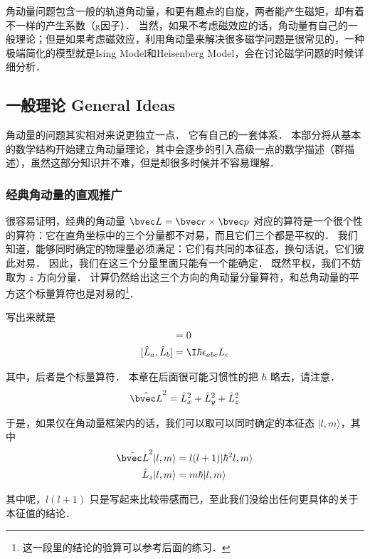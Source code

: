 
角动量问题包含一般的轨道角动量，和更有趣点的自旋，两者能产生磁矩，却有着不一样的产生系数（g因子）． 当然，如果不考虑磁效应的话，角动量有自己的一般理论；但是如果考虑磁效应，利用角动量来解决很多磁学问题是很常见的，一种极端简化的模型就是Ising Model和Heisenberg Model，会在讨论磁学问题的时候详细分析．

\subsection{一般理论 General Ideas}

角动量的问题其实相对来说更独立一点． 它有自己的一套体系． 本部分将从基本的数学结构开始建立角动量理论，其中会逐步的引入高级一点的数学描述（群描述），虽然这部分知识并不难，但是却很多时候并不容易理解．

\subsubsection{经典角动量的直观推广}

很容易证明，经典的角动量 $\bvec L = \bvec r\times \bvec p$ 对应的算符是一个很个性的算符：它在直角坐标中的三个分量都不对易，而且它们三个都是平权的． 我们知道，能够同时确定的物理量必须满足：它们有共同的本征态，换句话说，它们彼此对易． 因此，我们在这三个分量里面只能有一个能确定． 既然平权，我们不妨取为 $z$ 方向分量． 计算仍然给出这三个方向的角动量分量算符，和总角动量的平方这个标量算符也是对易的\footnote{这一段里的结论的验算可以参考后面的练习．}．

写出来就是
\begin{align}
[\hat L_z, \hat{\bvec L}^2] &= 0 \label{QMAM_eq1}\\
[\hat L_a, \hat L_b] &= \I\hbar\epsilon_{abc}L_c \label{QMAM_eq2}
\end{align}

其中，后者是个标量算符． 本章在后面很可能习惯性的把 $\hbar$ 略去，请注意．
\begin{equation}
\hat{\bvec L}^2 = \hat L_x^2+\hat L_y^2+\hat L_z^2
\end{equation}

于是，如果仅在角动量框架内的话，我们可以取可以同时确定的本征态 $|l,m\rangle$，其中
\begin{align}
\hat{\bvec L}^2|l,m\rangle &= l(l+1)|\hbar^2l,m\rangle\\
\hat L_z|l,m\rangle &= m\hbar|l,m\rangle
\end{align}

其中呢，$l(l+1)$ 只是写起来比较带感而已，至此我们没给出任何更具体的关于本征值的结论．

